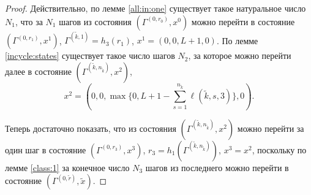 \documentclass[a4paper,12pt,russian]{extarticle}
\begin{document}
\begin{proof}
Действительно, по лемме \ref{all:in:one} существует такое натуральное число $N_1$, что за $N_1$ шагов из состояния $(\Gamma^{(0,r_0)},x^0)$ можно перейти в состояние  $(\Gamma^{(0,r_1)},x^1)$, $\Gamma^{(\tilde{k},1)}=h_3(r_1)$, $x^1=(0,0,L+1,0)$. По лемме \ref{incycle:states} существует такое число шагов $N_2$, за которое можно перейти далее в состояние $(\Gamma^{(\tilde{k},n_{\tilde{k}})},x^2)$, 
\begin{equation*}
x^2=(0,0,\max{\{0,L+1-\sum_{s=1}^{n_{\tilde{k}}} \ell(\tilde{k},s,3)\}},0).
\end{equation*}

Теперь достаточно показать, что из состояния $(\Gamma^{(\tilde{k},n_{\tilde{k}})},x^2)$ можно перейти за один шаг в состояние $(\Gamma^{(0,r_3)},x^3)$, $r_3=h_1(\Gamma^{(\tilde{k},n_{\tilde{k}})})$, $x^3=x^2$, поскольку по лемме \ref{class:1} за конечное число $N_3$ шагов из последнего можно перейти в состояние $(\Gamma^{(0,\tilde{r})},\tilde{x})$.


\end{proof}
\end{document}
